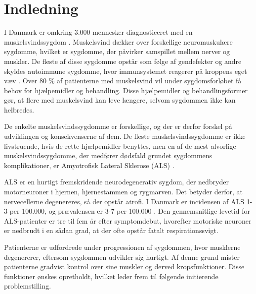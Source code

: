 \section{Indledning}



I Danmark er omkring 3.000 mennesker diagnosticeret med en muskelsvindssygdom \citep{universitet2013}. Muskelsvind dækker over forskellige neuromuskulære sygdomme, hvilket er sygdomme, der påvirker samspillet mellem nerver og muskler. De fleste af disse sygdomme opstår som følge af gendefekter og andre skyldes autoimmune sygdomme, hvor immunsystemet reagerer på kroppens eget væv \citep{arathata2014}. Over 80 \% af patienterne med muskelsvind vil under sygdomsforløbet få behov for hjælpemidler og behandling. Disse hjælpemidler og behandlingsformer gør, at flere med muskelsvind kan leve længere, selvom sygdommen ikke kan helbredes. 

De enkelte muskelsvindssygdomme er forskellige, og der er derfor forskel på udviklingen og konsekvenserne af dem. De fleste muskelsvindssygdomme er ikke livstruende, hvis de rette hjælpemidler benyttes, men en af de mest alvorlige muskelsvindssygdomme, der medfører dødsfald grundet sygdommens komplikationer, er Amyotrofisk Lateral Sklerose (ALS) \citep{henschke2012}. 

ALS er en hurtigt fremskridende neurodegenerativ sygdom, der nedbryder motorneuroner i hjernen, hjernestammen og rygmarven. Det betyder derfor, at nervecellerne degenereres, så der opstår atrofi. I Danmark er incidensen af ALS 1-3 per 100.000, og prævalensen er 3-7 per 100.000 \citep{russell2015}. Den gennemsnitlige levetid for ALS-patienter er tre til fem år efter symptomdebut, hvorefter motoriske neuroner er nedbrudt i en sådan grad, at der ofte opstår fatalt respirationssvigt. \citep{grehl2011, morris2015}

Patienterne er udfordrede under progressionen af sygdommen, hvor musklerne degenererer, eftersom sygdommen udvikler sig hurtigt. Af denne grund mister patienterne gradvist kontrol over sine muskler og derved kropsfunktioner. Disse funktioner ønskes opretholdt, hvilket leder frem til følgende initierende problemstilling. 
 
